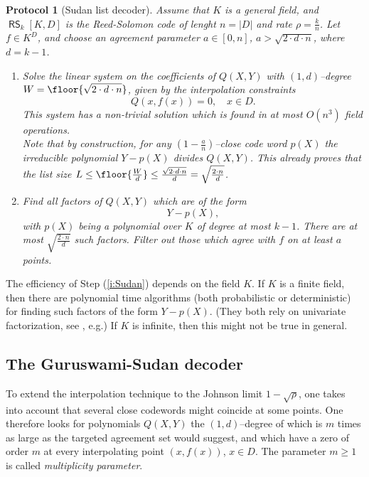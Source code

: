 \documentclass[11pt,article,oneside]{memoir}
\newtheorem{protocol}[]{Protocol}
\theoremstyle{definition}
\theoremstyle{remark}
\DeclareMathOperator{\RS}{\mathsf{RS}}
\begin{document}
\begin{protocol}[Sudan list decoder] 
Assume that $K$ is a general field, and $\RS_k[K,D]$ is the Reed-Solomon code of lenght $n=|D|$ and rate $\rho=\frac{k}{n}$. 
Let $f\in K^D$, and choose an agreement parameter $a\in [0,n]$,
$a>\sqrt{2\cdot d \cdot n}$, where $d= k-1$.
\begin{enumerate}
\item 
Solve the linear system on the coefficients of $Q(X,Y)$ with $(1,d)$--degree $W = \floor{\sqrt{2\cdot d\cdot n}}$, given by the interpolation constraints
\[
Q(x,f(x)) = 0, \quad x\in D.
\]
This system has a non-trivial solution which is found in at most $O(n^3)$ field operations.
\\
{\tiny
Note that by construction, for any $\left(1-\frac{a}{n}\right)$--close code word $p(X)$ the irreducible polynomial $Y-p(X)$ divides $Q(X,Y)$.
This already proves that the list size $L \leq \floor{\frac{W}{d}} \leq \frac{\sqrt{2\cdot d\cdot n}}{d} = \sqrt{\frac{2\cdot n}{d}}$.
}

\item 
\label{i:Sudan}
Find all factors of $Q(X,Y)$ which are of the form
\[
Y-p(X),
\] 
with $p(X)$ being a polynomial over $K$ of degree at most $k-1$. 
There are at most $\sqrt{\frac{2\cdot n}{d}}$ such factors. 
Filter out those which agree with $f$ on at least $a$ points. 
\end{enumerate}
\end{protocol}

The efficiency of Step (\ref{i:Sudan}) depends on the field $K$. 
If $K$ is a finite field, then there are polynomial time algorithms (both probabilistic or deterministic) for finding such factors of the form $Y-p(X)$. (They both rely on univariate factorization, see \cite{ListDecodingBook}, e.g.) 
If $K$ is infinite, then this might not be true in general. 



\subsection{The Guruswami-Sudan decoder}

To extend the interpolation technique to the Johnson limit $1 - \sqrt{\rho}$, one takes into account that several close codewords might coincide at some points. 
One therefore looks for polynomials $Q(X,Y)$ the $(1,d)$--degree of which is $m$ times as large as the targeted agreement set would suggest, and which have a zero of order $m$ at every interpolating point $(x,f(x))$, $x\in D$. 
The parameter $m\geq 1$ is called \textit{multiplicity parameter}.
\end{document}
